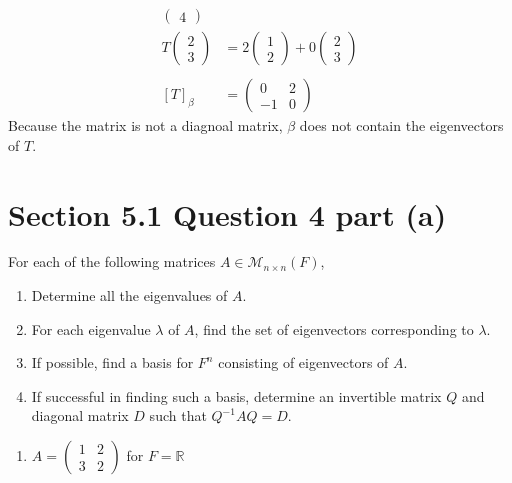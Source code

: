 \documentclass[13pt]{article}
\begin{document}
\begin{enumerate}[label=(\alph*),leftmargin=*]
\begin{align*}
\begin{pmatrix}
                        4
                      \end{pmatrix} \\
      T
      \begin{pmatrix}
        2 \\
        3
      \end{pmatrix}      &= 2
                           \begin{pmatrix}
                             1 \\
                             2
                           \end{pmatrix} + 0
                           \begin{pmatrix}
                             2 \\
                             3
                           \end{pmatrix} \\ \\
      [T]_\beta &=
                  \begin{pmatrix}
                    0 & 2 \\
                    -1 & 0
                  \end{pmatrix}
    \end{align*}
    Because the matrix is not a diagnoal matrix, $\beta$ does not contain the eigenvectors of $T$.
    \newpage
    \section*{Section 5.1 Question 4 part (a)}
    For each of the following matrices $A \in \mathcal{M}_{n \times n}(F)$,
    \begin{enumerate}[label=(\roman*),leftmargin=*]
    \item Determine all the eigenvalues of $A$.
    \item For each eigenvalue $\lambda$ of $A$, find the set of eigenvectors corresponding to $\lambda$.
    \item If possible, find a basis for $F^n$ consisting of eigenvectors of $A$.
    \item If successful in finding such a basis, determine an invertible matrix $Q$ and diagonal matrix $D$ such that $Q^{-1}AQ = D$.
    \end{enumerate}
    \begin{enumerate}[label=(\alph*),leftmargin=*]
    \item $A =
      \begin{pmatrix}
        1 & 2 \\
        3 & 2
      \end{pmatrix}
      $ for $F = \mathbb{R}$
    \end{enumerate}

\end{enumerate}
\end{document}
